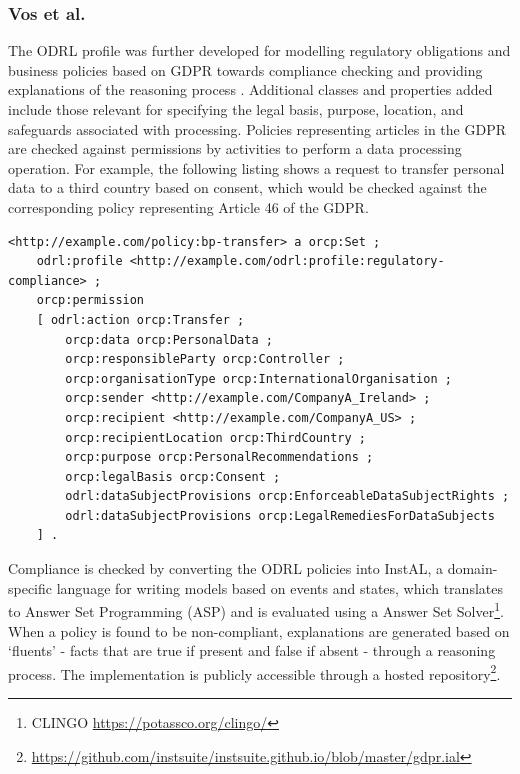 \subsubsection{Vos et al.}
The ODRL profile was further developed for modelling regulatory obligations and business policies based on GDPR towards compliance checking and providing explanations of the reasoning process \cite{vos_odrl_2019}. Additional classes and properties added include those relevant for specifying the legal basis, purpose, location, and safeguards associated with processing. Policies representing articles in the GDPR are checked against permissions by activities to perform a data processing operation. For example, the following listing shows a request to transfer personal data to a third country based on consent, which would be checked against the corresponding policy representing Article 46 of the GDPR. 
\begin{listing}[htbp]
\begin{verbatim}
<http://example.com/policy:bp-transfer> a orcp:Set ;
    odrl:profile <http://example.com/odrl:profile:regulatory-compliance> ;
    orcp:permission
    [ odrl:action orcp:Transfer ;
        orcp:data orcp:PersonalData ;
        orcp:responsibleParty orcp:Controller ;
        orcp:organisationType orcp:InternationalOrganisation ;
        orcp:sender <http://example.com/CompanyA_Ireland> ;
        orcp:recipient <http://example.com/CompanyA_US> ;
        orcp:recipientLocation orcp:ThirdCountry ;
        orcp:purpose orcp:PersonalRecommendations ;
        orcp:legalBasis orcp:Consent ;
        odrl:dataSubjectProvisions orcp:EnforceableDataSubjectRights ;
        odrl:dataSubjectProvisions orcp:LegalRemediesForDataSubjects
    ] .
\end{verbatim}
\end{listing}
Compliance is checked by converting the ODRL policies into InstAL, a domain-specific language for writing models based on events and states, which translates to Answer Set Programming (ASP) and is evaluated using a Answer Set Solver\footnote{CLINGO \url{https://potassco.org/clingo/}}. When a policy is found to be non-compliant, explanations are generated based on `fluents' - facts that are true if present and false if absent - through a reasoning process. The implementation is publicly accessible through a hosted repository\footnote{\url{https://github.com/instsuite/instsuite.github.io/blob/master/gdpr.ial}}. 

